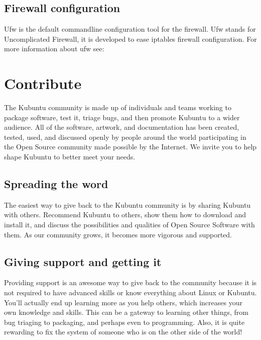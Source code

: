 \documentclass[letterpaper,10pt,english]{sphinxmanual}
\begin{document}
\section{Firewall configuration}
\label{\detokenize{docs/software:firewall-configuration}}
Ufw is the default commandline configuration tool for the firewall. Ufw stands for Uncomplicated Firewall, it is developed to ease iptables firewall configuration. For more information about ufw see: 


\chapter{Contribute}
\label{\detokenize{docs/contribute:contribute}}\label{\detokenize{docs/contribute:contribute-link}}\label{\detokenize{docs/contribute::doc}}
The Kubuntu community is made up of individuals and teams working to package software, test it, triage bugs, and then promote Kubuntu to a wider audience. All of the software, artwork, and documentation has been created, tested, used, and discussed openly by people around the world participating in the Open Source community made possible by the Internet. We invite you to help shape Kubuntu to better meet your needs.


\section{Spreading the word}
\label{\detokenize{docs/contribute:spreading-the-word}}
The easiest way to give back to the Kubuntu community is by sharing Kubuntu with others. Recommend Kubuntu to others, show them how to download and install it, and discuss the possibilities and qualities of Open Source Software with them. As our community grows, it becomes more vigorous and supported.


\section{Giving support and getting it}
\label{\detokenize{docs/contribute:giving-support-and-getting-it}}
Providing support is an awesome way to give back to the community because it is not required to have advanced skills or know everything about Linux or Kubuntu. You’ll actually end up learning more as you help others, which increases your own knowledge and skills. This can be a gateway to learning other things, from bug triaging to packaging, and perhaps even to programming. Also, it is quite rewarding to fix the system of someone who is on the other side of the world!
\end{document}

